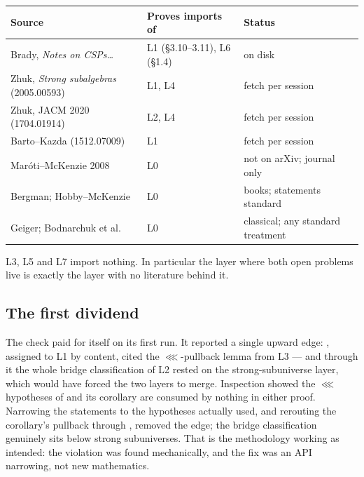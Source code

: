 \begin{center}\small
\begin{tabular}{@{}lll@{}}
\hline
Source & Proves imports of & Status \\
\hline
Brady, \emph{Notes on CSPs\dots} & L1 (\S3.10--3.11), L6 (\S1.4) & on disk \\
Zhuk, \emph{Strong subalgebras} (2005.00593) & L1, L4 & fetch per session \\
Zhuk, JACM 2020 (1704.01914) & L2, L4 & fetch per session \\
Barto--Kazda (1512.07009) & L1 & fetch per session \\
Mar\'oti--McKenzie 2008 & L0 & not on arXiv; journal only \\
Bergman; Hobby--McKenzie & L0 & books; statements standard \\
Geiger; Bodnarchuk et al. & L0 & classical; any standard treatment \\
\hline
\end{tabular}
\end{center}

L3, L5 and L7 import nothing. In particular the layer where both open
problems live is exactly the layer with no literature behind it.

\subsection{The first dividend}

The check paid for itself on its first run. It reported a single upward
edge: , assigned to L1 by content, cited the
$\lll$-pullback lemma  from L3 --- and through it the
whole bridge classification of L2 rested on the strong-subuniverse layer,
which would have forced the two layers to merge. Inspection showed the $\lll$
hypotheses of  and its corollary are consumed by
nothing in either proof. Narrowing the statements to the hypotheses actually
used, and rerouting the corollary's pullback through
, removed the edge; the bridge classification
genuinely sits below strong subuniverses. That is the methodology working as
intended: the violation was found mechanically, and the fix was an API
narrowing, not new mathematics.
